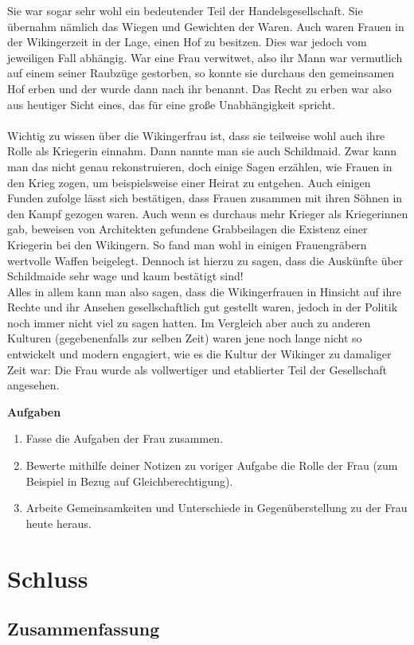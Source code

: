 \documentclass[12pt,a4paper,ngerman,openany]{book}
\newcommand{\aufgaben}[1]{
  \begin{tcolorbox}
    \textbf{Aufgaben}
    \begin{enumerate}
      #1
    \end{enumerate}
  \end{tcolorbox}
} %
\newcommand{\fchapter}[1]{\chapter{#1}\thispagestyle{chapterstyle}}
\begin{document}
Sie war sogar sehr wohl ein bedeutender Teil der Handelsgesellschaft. Sie übernahm nämlich das Wiegen und Gewichten der Waren.
Auch waren Frauen in der Wikingerzeit in der Lage, einen Hof zu besitzen. Dies war jedoch vom jeweiligen Fall abhängig. War eine Frau verwitwet, also ihr Mann war vermutlich auf einem seiner Raubzüge gestorben, so konnte sie durchaus den gemeinsamen Hof erben und der wurde dann nach ihr benannt. Das Recht zu erben war also aus heutiger Sicht eines, das für eine große Unabhängigkeit spricht.\\\\
Wichtig zu wissen über die Wikingerfrau ist, dass sie teilweise wohl auch ihre Rolle als Kriegerin einnahm. Dann nannte man sie auch Schildmaid. Zwar kann man das nicht genau rekonstruieren, doch einige Sagen erzählen, wie Frauen in den Krieg zogen, um beispielsweise einer Heirat zu entgehen. Auch einigen Funden zufolge lässt sich bestätigen, dass Frauen zusammen mit ihren Söhnen in den Kampf gezogen waren. Auch wenn es durchaus mehr Krieger als Kriegerinnen gab, beweisen von Architekten gefundene Grabbeilagen die Existenz einer Kriegerin bei den Wikingern. So fand man wohl in einigen Frauengräbern wertvolle Waffen beigelegt. Dennoch ist hierzu zu sagen, dass die Auskünfte über Schildmaide sehr wage und kaum bestätigt sind!\\
Alles in allem kann man also sagen, dass die Wikingerfrauen in Hinsicht auf ihre Rechte und ihr Ansehen gesellschaftlich gut gestellt waren, jedoch in der Politik noch immer nicht viel zu sagen hatten. Im Vergleich aber auch zu anderen Kulturen (gegebenenfalls zur selben Zeit) waren jene noch lange nicht so entwickelt und modern engagiert, wie es die Kultur der Wikinger zu damaliger Zeit war:
Die Frau wurde als vollwertiger und etablierter Teil der Gesellschaft angesehen.

\vspace{0.66cm}

\aufgaben{
  \item Fasse die Aufgaben der Frau zusammen.
  \item Bewerte mithilfe deiner Notizen zu voriger Aufgabe die Rolle der Frau (zum Beispiel in Bezug auf Gleichberechtigung).
  \item Arbeite Gemeinsamkeiten und Unterschiede in Gegenüberstellung zu der Frau heute heraus.
}

\fchapter{Schluss}

\section{Zusammenfassung}
\end{document}
